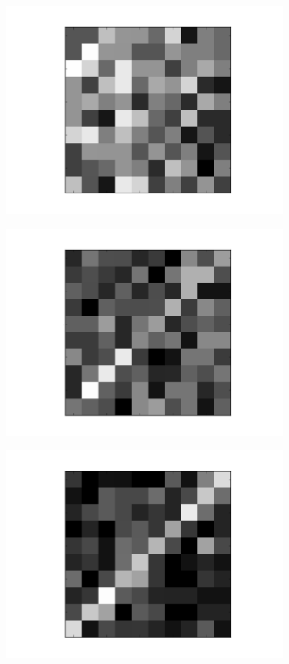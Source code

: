 \begin{figure}[h!]
	
	\begin{subfigure}{.25\textwidth}
  		\centering
  		\includegraphics[width=0.8\linewidth]{imgs/reconst/00002.png}
  		\label{fig:sub1}
	\end{subfigure}%
	\begin{subfigure}{.25\textwidth}
  		\centering
  		\includegraphics[width=0.8\linewidth]{imgs/reconst/00004.png}
  		\label{fig:sub1}
	\end{subfigure}%
	\begin{subfigure}{.25\textwidth}
  		\centering
  		\includegraphics[width=0.8\linewidth]{imgs/reconst/00006.png}

\end{subfigure}
\end{figure}

